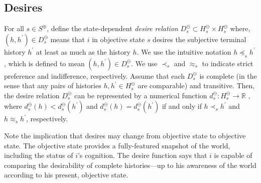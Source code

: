 \documentclass[
11pt,
titlepage,
reqno,
]{article}%
\theoremstyle{definition}
\begin{document}
\subsection{Desires} \label{sec: desires}
For all $s\in S^\oplus$, define the state-dependent \textit{desire relation}    $D^\ominus_s\subset H^\ominus_s\times H^\ominus_s$ where, $(h,h^{\prime})\in D^\ominus_s$ means that  $i$ in objective state $s$ desires the subjective terminal history $h^{\prime}$ at least as much as the history $h$. 
We use the intuitive notation $h\preceq_s h^{\prime}$, which is defined to mean $(h,h^{\prime})\in D^\ominus_s$. 
We use $\prec_s$ and $\approx_s$ to indicate strict preference and indifference, respectively. 
Assume that each $D^\ominus_s$ is complete (in the sense that any pairs of histories $h,h^{\prime}\in H^\ominus_s$ are comparable) and transitive. 
Then, the desire relation $D^\ominus_s$ can be represented by a numerical function $d^\ominus_s:H^\ominus_s\rightarrow \mathbb{R}$ , where $d^\ominus_s(h)< d^\ominus_s(h^\prime)$ and $d^\ominus_s(h)= d^\ominus_s(h^\prime)$ if and only if  $h\prec_s h^{\prime}$ and $h\approx_s h^{\prime}$, respectively.

Note the implication that desires may change from objective state to objective state.
The objective state provides a fully-featured snapshot of the world, including the status of $i$'s cognition. 
The desire function says that $i$ is capable of comparing the desirability of complete histories---up to his awareness of the world according to his present, objective state.
\end{document}
